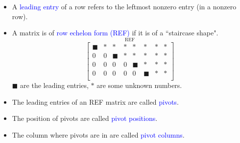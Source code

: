 \documentclass{beamer}
\theoremstyle{definition}
\theoremstyle{remark}
\begin{document}
\begin{frame}[t]
\begin{definition}\hfill
\begin{itemize}
\item A \textcolor{blue}{leading entry} of a row refers to the leftmost nonzero entry (in a nonzero row).
\pause
\item A matrix is of \textcolor{blue}{row echelon form (REF)} if it is of a ``staircase shape".
\[
\overset{\text{REF}}{
\begin{bmatrix}
\blacksquare&*&*&*&*&*&*&*\\
0&0&\blacksquare&*&*&*&*&*\\
0&0&0&0&\blacksquare&*&*&*\\
0&0&0&0&0&\blacksquare&*&*\\
\end{bmatrix}
}
\]
$\blacksquare$ are the leading entries, $*$ are some unknown numbers.
\pause
\item The leading entries of an REF matrix are called \textcolor{blue}{pivots}.
\pause
\item The position of pivots are called \textcolor{blue}{pivot positions}.
\pause
\item The column where pivots are in are called \textcolor{blue}{pivot columns}.
\end{itemize}
\end{definition}
\end{frame}
\end{document}
